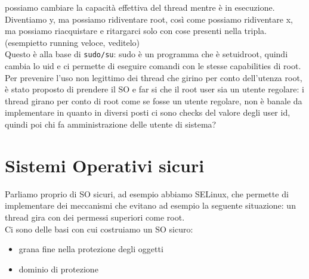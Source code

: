\documentclass[12pt, oneside]{extbook}
\begin{document}
possiamo cambiare la capacità effettiva del thread mentre è in esecuzione. Diventiamo y, ma possiamo ridiventare root, così come possiamo ridiventare x, ma possiamo riacquistare e ritargarci solo con cose presenti nella tripla.
(esempietto running veloce, veditelo)\\Questo è alla base di \texttt{sudo/su}: sudo è un programma che è setuidroot, quindi cambia lo uid e ci permette di eseguire comandi con le stesse capabilities di root.\\Per prevenire l'uso non legittimo dei thread che girino per conto dell'utenza root, è stato proposto di prendere il SO e far si che il root user sia un utente regolare: i thread girano per conto di root come se fosse un utente regolare, non è banale da implementare in quanto in diversi posti ci sono checks del valore degli user id, quindi poi chi fa amministrazione delle utente di sistema?
\section{Sistemi Operativi sicuri}
Parliamo proprio di SO sicuri, ad esempio abbiamo SELinux, che permette di implementare dei meccanismi che evitano ad esempio la seguente situazione: un thread gira con dei permessi superiori come root.\\Ci sono delle basi con cui costruiamo un SO sicuro:
\begin{itemize}
	\item grana fine nella protezione degli oggetti
	\item dominio di protezione
\end{itemize}
\end{document}
